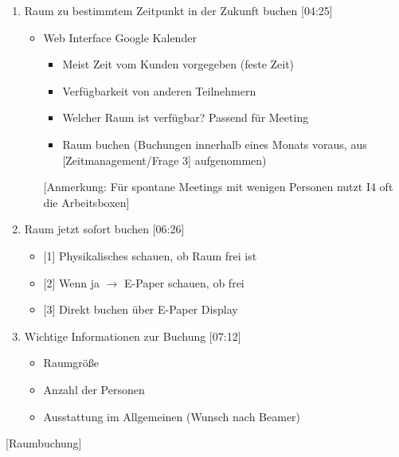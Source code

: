 \begin{enumerate}
    \item Raum zu bestimmtem Zeitpunkt in der Zukunft buchen [04:25]
     \begin{itemize}
        \item Web Interface Google Kalender
        \begin{itemize}
            \item Meist Zeit vom Kunden vorgegeben (feste Zeit)
            \item Verfügbarkeit von anderen Teilnehmern
            \item Welcher Raum ist verfügbar? Passend für Meeting
            \item Raum buchen (Buchungen innerhalb eines Monats voraus, aus [Zeitmanagement/Frage 3] aufgenommen)
        \end{itemize}
        \item[] [Anmerkung: Für spontane Meetings mit wenigen Personen nutzt I4 oft die Arbeitsboxen]
    \end{itemize}
    
    \item Raum jetzt sofort buchen [06:26]
     \begin{itemize}
        \item{} [1]	Physikalisches schauen, ob Raum frei ist
        \item{} [2]	Wenn ja $\rightarrow$ E-Paper schauen, ob frei
        \item{} [3]	Direkt buchen über E-Paper Display
    \end{itemize}
    
    \item Wichtige Informationen zur Buchung [07:12]
     \begin{itemize}
        \item Raumgröße
        \item Anzahl der Personen
        \item Ausstattung im Allgemeinen (Wunsch nach Beamer)
    \end{itemize}

\end{enumerate}

[Raumbuchung]

